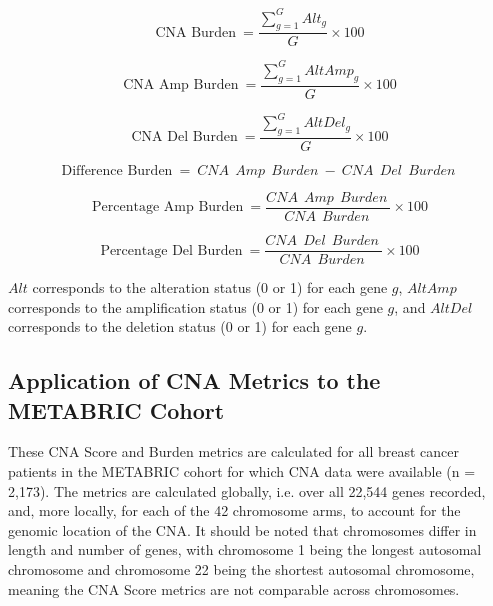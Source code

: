 \begin{equation}
\text{CNA Burden}\: = \frac{\sum_{g = 1}^{G}  Alt_g}{G}\times100
\label{eq:CNAB1}
\end{equation}

\begin{equation}
\text{CNA Amp Burden}\: = \frac{\sum_{g = 1}^{G} {AltAmp}_g}{G}\times100
\label{eq:CNAB2}
\end{equation}

\begin{equation}
\text{CNA Del Burden}\: = \frac{\sum_{g = 1}^{G} {AltDel}_g}{G}\times100
\label{eq:CNAB3}
\end{equation}

\begin{equation}
\text{Difference Burden}\: = \:CNA\:\:Amp\:\:Burden\: - \:CNA\:\:Del\:\:Burden\:
\label{eq:CNAB4}
\end{equation}

\begin{equation}
\text{Percentage Amp Burden}\: = \frac{CNA\:\:Amp\:\:Burden\:}{CNA\:\:Burden\:}\times100
\label{eq:CNAB5}
\end{equation}

\begin{equation}
\text{Percentage Del Burden}\: = \frac{CNA\:\:Del\:\:Burden\:}{CNA\:\:Burden\:}\times100
\label{eq:CNAB6}
\end{equation}

$Alt$ corresponds to the alteration status (0 or 1) for each gene $g$, $AltAmp$ corresponds to the amplification status (0 or 1) for each gene $g$, and $AltDel$ corresponds to the deletion status (0 or 1) for each gene $g$.

\subsection{Application of CNA Metrics to the METABRIC Cohort}
These CNA Score and Burden metrics are calculated for all breast cancer patients in the METABRIC cohort for which CNA data were available (n = 2,173). The metrics are calculated globally, i.e. over all 22,544 genes recorded, and, more locally, for each of the 42 chromosome arms, to account for the genomic location of the CNA. It should be noted that chromosomes differ in length and number of genes, with chromosome 1 being the longest autosomal chromosome and chromosome 22 being the shortest autosomal chromosome, meaning the CNA Score metrics are not comparable across chromosomes. 

